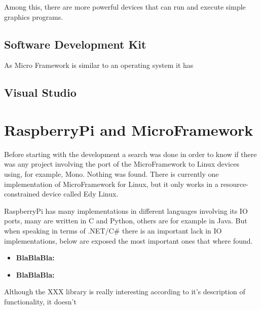 Among this, there are more powerful devices that can run and execute simple graphics programs.


\subsection{Software Development Kit}\label{SS:MicroFramework-SDK}
As Micro Framework is similar to an operating system it has


\subsection{Visual Studio}\label{SS:MicroFramework-IDE}

\section{RaspberryPi and MicroFramework}\label{S:RaspberryPi-NETMF}
Before starting with the development a search was done in order to know if there was any project involving the port of the MicroFramework to Linux devices using, for example, Mono. Nothing was found.
There is currently one implementation of MicroFramework for Linux, but it only works in a resource-constrained device called Edy Linux.

RaspberryPi has many implementations in different languages involving its IO ports, many are written in C and Python, others are for example in Java. But when speaking in terms of .NET/C\# there is an important lack in IO implementations, below are exposed the most important ones that where found.

\begin{itemize}
\item \textbf{BlaBlaBla:}
\item \textbf{BlaBlaBla:}
\end{itemize}

Although the XXX library is really interesting according to it's description of functionality, it doesn't 